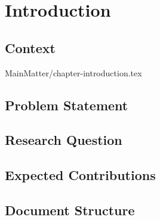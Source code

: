 
%

\chapter{Introduction}
\label{chap:introduction}

\section{Context}
\label{sec:intro:context}
MainMatter/chapter-introduction.tex


\section{Problem Statement}
\label{sec:intro:problem}

\section{Research Question}
\label{sec:intro:question}

\section{Expected Contributions}
\label{sec:intro:contributions}

\section{Document Structure}
\label{sec:intro:structure}
